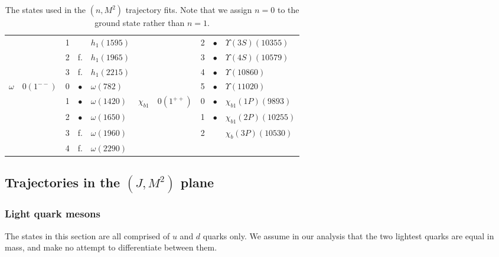 \documentclass[11pt,a4]{article}
\begin{document}
\begin{table}[t!]
\begin{tabular}{|c|c|c|c|l|c|c|c|c|l|}
							& &1 & & \(h_1(1595)\) &				            &	& 2 & \(\bullet\) & \(\Upsilon(3S)(10355)\) \\

							& &2 & f. & \(h_1(1965)\) &				            &	& 3 & \(\bullet\) & \(\Upsilon(4S)(10579)\) \\

							& &3 & f. & \(h_1(2215)\) &					 & & 4& \(\bullet\) & \(\Upsilon(10860)\) \\ \cline{1-5}

		\(\omega\)&\(0(1^{--})\) &0 & \(\bullet\) & \(\omega(782)\) &				            &	& 5 & \(\bullet\) & \(\Upsilon(11020)\) \\ \cline{6-10}

							& &1 & \(\bullet\) & \(\omega(1420)\) &				         \(\chi_{b1}\) &	\(0(1^{++})\) & 0 & \(\bullet\) & \(\chi_{b1}(1P)(9893)\) \\

							& &2 & \(\bullet\) & \(\omega(1650)\) &				   & & 1 & \(\bullet\) & \(\chi_{b1}(2P)(10255)\) \\

							& &3 & f. & \(\omega(1960)\) &				            &	& 2 & & \(\chi_{b}(3P)(10530)\) \\

							& &4 & f. & \(\omega(2290)\) &				             & & & & \\ \hline

	\end{tabular}

	\caption{\label{tab:states_n} The states used in the \((n,M^2)\) trajectory fits. Note that we assign \(n = 0\) to the ground state rather than \(n = 1\).}

\end{table}

	\subsection{Trajectories in the \texorpdfstring{$(J,M^2)$}{(J,M2)} plane}
			\subsubsection{Light quark mesons}
			
			The states in this section are all comprised of \(u\) and \(d\) quarks only. We assume in our analysis that the two lightest quarks are equal in mass, and make no attempt to differentiate between them.
				
\end{document}

